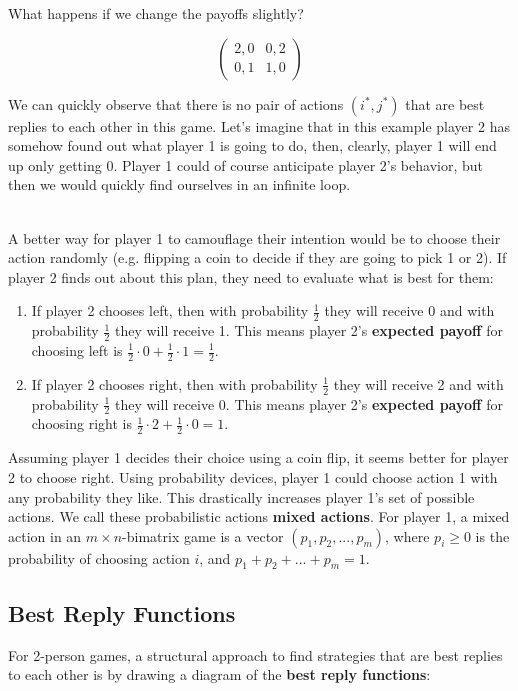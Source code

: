 \documentclass[12pt]{article}
\begin{document}
\newpage
\noindent
What happens if we change the payoffs slightly?

\[ \begin{pmatrix}
    2,0 & 0,2 \\
    0,1 & 1,0
\end{pmatrix} \]

\noindent
We can quickly observe that there is no pair of actions $(i^*, j^*)$ that are best replies to each other in this game.
Let's imagine that in this example player 2 has somehow found out what player 1 is going to do, then, clearly, player 1 will end up only getting 0.
Player 1 could of course anticipate player 2's behavior, but then we would quickly find ourselves in an infinite loop.

\noindent
\\
A better way for player 1 to camouflage their intention would be to choose their action randomly (e.g. flipping a coin to decide if they are going to pick 1 or 2).
If player 2 finds out about this plan, they need to evaluate what is best for them:

\begin{enumerate}
    \item If player 2 chooses left, then with probability $\frac{1}{2}$ they will receive 0 and with probability $\frac{1}{2}$ they will receive 1.
    This means player 2's \textbf{expected payoff} for choosing left is $\frac{1}{2} \cdot 0 + \frac{1}{2} \cdot 1 = \frac{1}{2}$.
    \item If player 2 chooses right, then with probability $\frac{1}{2}$ they will receive 2 and with probability $\frac{1}{2}$ they will receive 0.
    This means player 2's \textbf{expected payoff} for choosing right is $\frac{1}{2} \cdot 2 + \frac{1}{2} \cdot 0 = 1$.
\end{enumerate}

\noindent
Assuming player 1 decides their choice using a coin flip, it seems better for player 2 to choose right.
Using probability devices, player 1 could choose action 1 with any probability they like.
This drastically increases player 1's set of possible actions.
We call these probabilistic actions \textbf{mixed actions}.
For player 1, a mixed action in an $m \times n$-bimatrix game is a vector $(p_1, p_2, ... , p_m)$, where $p_i \geq 0$ is the probability of choosing action $i$, and $p_1 + p_2 + ... + p_m = 1$.

\subsection{Best Reply Functions}
For 2-person games, a structural approach to find strategies that are best replies to each other is by drawing a diagram of the \textbf{best reply functions}:
\end{document}
